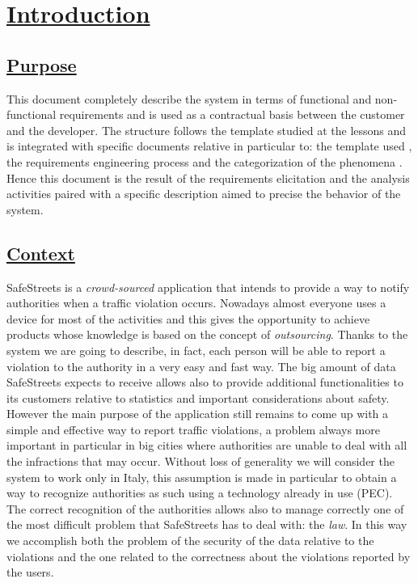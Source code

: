 \section[Introduction]{\hyperlink{toc}{Introduction}}
\label{sec:introduction}
\subsection[Purpose]{\hyperlink{toc}{Purpose}}
	\label{sec:purpose}
	This document completely describe the system in terms of functional and non-functional requirements and is used as a contractual basis between the customer and the developer. The structure follows the template studied at the lessons and is integrated with specific documents relative in particular to: the template used \cite{IEEErasd}, the requirements engineering process \cite{IEEEre} and the categorization of the phenomena \cite{W&M}. Hence this document is the result of the requirements elicitation and the analysis activities paired with a specific description aimed to precise the behavior of the system.
	
\subsection[Context]{\hyperlink{toc}{Context}}
	SafeStreets is a \emph{crowd-sourced} application that intends to provide a way to notify authorities when a traffic violation occurs. Nowadays almost everyone uses a device for most of the activities and this gives the opportunity to achieve products whose knowledge is based on the concept of \emph{outsourcing}. Thanks to the system we are going to describe, in fact, each person will be able to report a violation to the authority in a very easy and fast way. The big amount of data SafeStreets expects to receive allows also to provide additional functionalities to its customers relative to statistics and important considerations about safety. However the main purpose of the application still remains to come up with a simple and effective way to report traffic violations, a problem always more important in particular in big cities where authorities are unable to deal with all the infractions that may occur. Without loss of generality we will consider the system to work only in Italy, this assumption is made in particular to obtain a way to recognize authorities as such using a technology already in use (PEC). The correct recognition of the authorities allows also to manage correctly one of the most difficult problem that SafeStreets has to deal with: the \emph{law}. In this way we accomplish both the problem of the security of the data relative to the violations and the one related to the correctness about the violations reported by the users.
	
